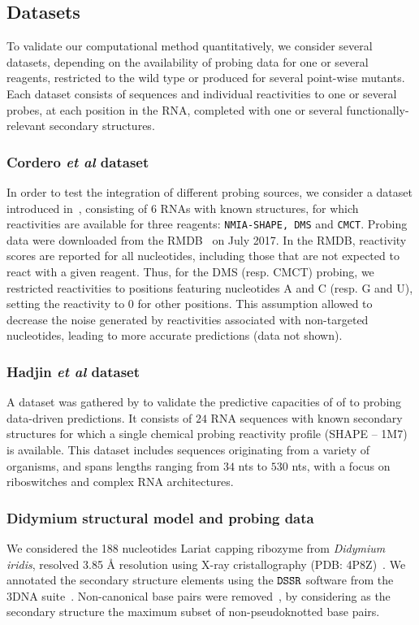 \documentclass[a4,center,fleqn]{NAR}
\newcommand{\Software}[1]{$\text{\ttfamily #1}$}
\newcommand{\SH }{{\tt SHAPE}\xspace}
\begin{document}
\subsection{Datasets} 
\label{sec:datasets}
To validate our computational method quantitatively, we consider several datasets, depending on the availability of probing data for one or several reagents, restricted to the wild type or produced for several point-wise mutants. Each dataset consists of sequences and individual reactivities to one or several probes, at each position in the RNA, completed with one or several functionally-relevant secondary structures.


\subsubsection{Cordero \emph{et al} dataset} 

In order to test the integration of different probing sources, we consider a dataset introduced in~\citet{Cordero2012}, consisting of $6$ RNAs with known structures, for which reactivities are available for three reagents: {\tt NMIA-\SH, DMS} and {\tt CMCT}. 
Probing data were downloaded from the RMDB~\citep{Cordero2012a} on July 2017. In the RMDB, reactivity scores are reported for all nucleotides, including those that are not expected to react with a given reagent. Thus, for the DMS (resp. CMCT) probing, we restricted reactivities to positions featuring nucleotides {\sf A} and {\sf C} (resp. {\sf G} and {\sf U}), setting the reactivity to 0 for other positions. This assumption allowed to decrease the noise generated by reactivities associated with non-targeted nucleotides, leading to more accurate predictions (data not shown). 


\subsubsection{Hadjin \emph{et al} dataset} 

A dataset was gathered by \citet{Hajdin2013} to validate the predictive capacities of 
of to probing data-driven predictions. It consists of $24$ RNA sequences with known secondary structures for which a single chemical probing reactivity profile (SHAPE -- 1M7) is available.
This dataset includes sequences originating from a variety of organisms, and spans lengths ranging from $34$ nts to $530$ nts, with a focus on riboswitches and complex RNA architectures. 

\subsubsection{Didymium structural model and probing data} 
We considered the 188 nucleotides Lariat capping ribozyme from {\itshape Didymium iridis}, resolved 3.85 \AA{} resolution using X-ray cristallography (PDB: 4P8Z)~\citep{Meyer2014}.  We annotated the secondary structure elements using the \Software{DSSR} software from the 3DNA suite~\cite{CitationNeeded}. Non-canonical base pairs were removed~\citep{Smit2008}, by considering as the secondary structure the maximum subset of non-pseudoknotted base pairs.
\end{document}
